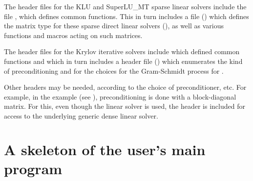 The header files for the KLU and SuperLU\_MT sparse linear solvers
include the file , which defines common functions.
This in turn includes a file () which defines
the matrix type for these sparse direct linear solvers (),
as well as various functions and macros acting on such matrices.

The header files for the Krylov iterative solvers include
 which defined common functions and which in turn
includes a header file () which enumerates
the kind of preconditioning and for the choices for the Gram-Schmidt
process for {\spgmr}.

Other headers may be needed, according to the choice of
preconditioner, etc.  For example, in the 
example (see \cite{kinsol_ex}), preconditioning is done with a
block-diagonal matrix. For this, even though the {\kinspgmr} linear
solver is used, the header  is included for
access to the underlying generic dense linear solver.

\section{A skeleton of the user's main program}\label{s:skeleton_sol}

